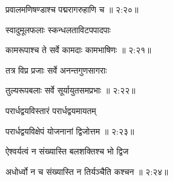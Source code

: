 
{\devanagarifont प्रवालमणिषण्डाश्च पद्मरागरुहाणि च {॥ २:२०॥} \veg\dontdisplaylinenum }%

{\devanagarifont स्वादुमूलफलाः स्कन्धलताविटपपादपाः \thinspace{\dandab} \dontdisplaylinenum }%


{\devanagarifont कामरूपाश्च ते सर्वे कामदाः कामभाषिणः {॥ २:२१॥} \veg\dontdisplaylinenum }%
  
{\devanagarifont तत्र विप्र प्रजाः सर्वे अनन्तगुणसागराः \thinspace{\dandab} \dontdisplaylinenum }%
 

{\devanagarifont तुल्यरूपबलाः सर्वे सूर्यायुतसमप्रभाः {॥ २:२२॥} \veg\dontdisplaylinenum }%

{\devanagarifont परार्धद्वयविस्तारं परार्धद्वयमायतम् \thinspace{\dandab} \dontdisplaylinenum }%
 

{\devanagarifont परार्धद्वयविक्षेपं योजनानां द्विजोत्तम {॥ २:२३॥} \veg\dontdisplaylinenum }%

{\devanagarifont ऐश्वर्यत्वं न संख्यास्ति बलशक्तिश्च भो द्विज \thinspace{\dandab} \dontdisplaylinenum }%


{\devanagarifont अधोर्ध्वो न च संख्यास्ति न तिर्यञ्चैति कश्चन {॥ २:२४॥} \veg\dontdisplaylinenum }%
     \var{{\devanagarifont \numnoemph\vc \lem \mssALL, \om\ \msNaacorr}}%

